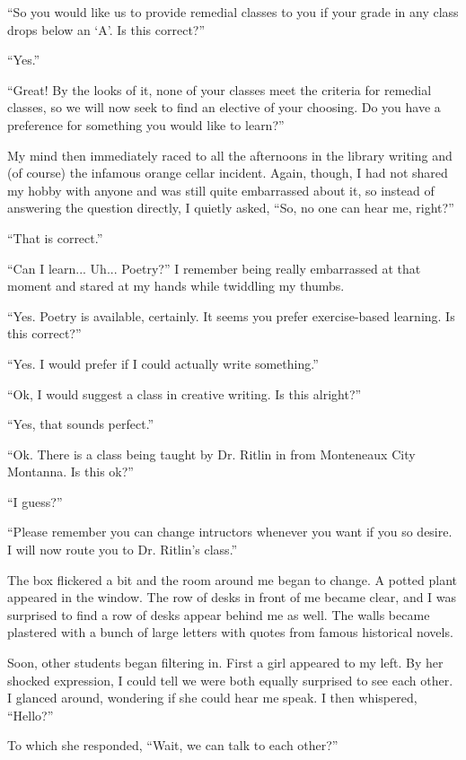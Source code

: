 ``So you would like us to provide remedial classes to you if your grade in any class drops below an `A'. Is this correct?''

``Yes.''

``Great! By the looks of it, none of your classes meet the criteria for remedial classes, so we will now seek to find an elective of your choosing. Do you have a preference for something you would like to learn?''

My mind then immediately raced to all the afternoons in the library writing and (of course) the infamous orange cellar incident.
Again, though, I had not shared my hobby with anyone and was still quite embarrassed about it, so instead of answering the question directly, I quietly asked, ``So, no one can hear me, right?''

``That is correct.''

``Can I learn... Uh... Poetry?'' I remember being really embarrassed at that moment and stared at my hands while twiddling my thumbs.

``Yes. Poetry is available, certainly. It seems you prefer exercise-based learning. Is this correct?''

``Yes. I would prefer if I could actually write something.''

``Ok, I would suggest a class in creative writing. Is this alright?''

``Yes, that sounds perfect.''

``Ok. There is a class being taught by Dr. Ritlin in from Monteneaux City Montanna. Is this ok?''

``I guess?''

``Please remember you can change intructors whenever you want if you so desire. I will now route you to Dr. Ritlin's class.''

The box flickered a bit and the room around me began to change.
A potted plant appeared in the window.
The row of desks in front of me became clear, and I was surprised to find a row of desks appear behind me as well.
The walls became plastered with a bunch of large letters with quotes from famous historical novels.

Soon, other students began filtering in.
First a girl appeared to my left.
By her shocked expression, I could tell we were both equally surprised to see each other.
I glanced around, wondering if she could hear me speak.
I then whispered, ``Hello?''

To which she responded, ``Wait, we can talk to each other?''

